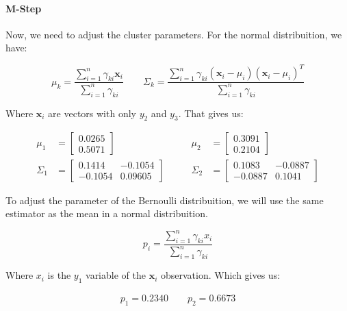 \documentclass[12pt]{article}
\begin{document}
\begin{enumerate}[leftmargin=\labelsep]
    \paragraph{M-Step} Now, we need to adjust the cluster parameters. For the normal distribuition, we have:

    \begin{equation}
        \mu_k = \frac{\sum_{i=1}^{n}\gamma_{ki}\mathbf{x}_i}{\sum_{i=1}^{n}\gamma_{ki}} \qquad \Sigma_k = \frac{\sum_{i=1}^{n}\gamma_{ki}(\mathbf{x}_i-\mu_i)(\mathbf{x}_i-\mu_i)^T}{\sum_{i=1}^{n}\gamma_{ki}}
    \end{equation}

    Where $\mathbf{x}_i$ are vectors with only $y_2$ and $y_3$. That gives us:

    \begin{equation}
    \begin{aligned}
        \mu_1 &= \begin{bmatrix}
            0.0265 \\ 0.5071
        \end{bmatrix} &\qquad \mu_2&= \begin{bmatrix}
            0.3091 \\ 0.2104
        \end{bmatrix} \\
        \Sigma_1 &= \begin{bmatrix}
            0.1414  & -0.1054 \\
            -0.1054 & 0.09605 
        \end{bmatrix} &\qquad \Sigma_2 &= \begin{bmatrix}
            0.1083  & -0.0887 \\
            -0.0887 &  0.1041
        \end{bmatrix}
    \end{aligned}
    \end{equation}

    To adjust the parameter of the Bernoulli distribuition, we will use the same estimator as the mean in a normal distribuition.

    \begin{equation}
        p_i = \frac{\sum_{i=1}^{n}\gamma_{ki}x_i}{\sum_{i=1}^{n}\gamma_{ki}}
    \end{equation}

    Where $x_i$ is the $y_1$ variable of the $\mathbf{x}_i$ observation. Which gives us:

    \begin{equation}
    \begin{aligned}
        p_1 = 0.2340 \qquad p_2 = 0.6673
    \end{aligned}
    \end{equation}


\end{enumerate}
\end{document}
